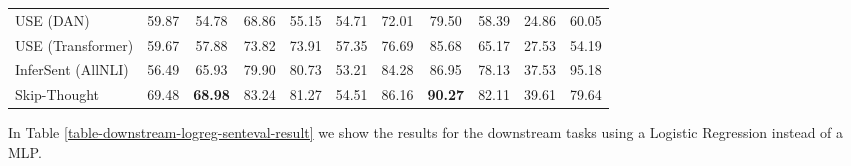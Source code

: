 \documentclass{article}
\begin{document}
\begin{table}[h]
{\begin{tabular}{lcccccccccc}
USE (DAN)         &        59.87 &                  54.78 &      68.86 &   55.15 &      54.71 &       72.01 &  79.50 &            58.39 &  24.86 &        60.05 \\
USE (Transformer)    &        59.67 &                  57.88 &      73.82 &   73.91 &      57.35 &       76.69 &  85.68 &            65.17 &  27.53 &        54.19 \\
InferSent (AllNLI)            &        56.49 &                  65.93 &      79.90 &   80.73 &      53.21 &       84.28 &  86.95 &            78.13 &  37.53 &        95.18 \\
Skip-Thought         &        69.48 &                  \textbf{68.98} &      83.24 &   81.27 &      54.51 &       86.16 &  \textbf{90.27} &            82.11 &  39.61 &        79.64 \\
\bottomrule
\end{tabular}}
\end{table}

In Table \ref{table-downstream-logreg-senteval-result} we show the results for the downstream tasks using a Logistic Regression instead of a MLP.
\end{document}
